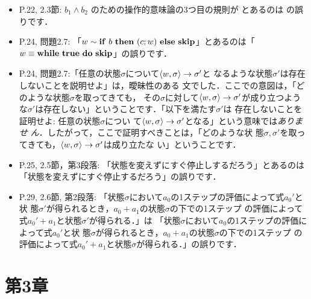 \documentclass[12pt,titlepage,twoside,openright,dvipdfmx]{jsbook}
\theoremstyle{definition}
\begin{document}
\begin{itemize}
  \item P.22, 2.3節: $b_1 \land b_2$ のための操作的意味論の3つ目の規則が
    \infrule
    { \arrow \Ttrue \andalso {} \arrow \Ttrue}
    { \arrow \Tfalse}
    とあるのは
    \infrule
    { \arrow \Ttrue \andalso {} \arrow \Ttrue}
    { \arrow \Ttrue}
    の誤りです．
  \item P.24, 問題2.7: 「$w \sim \Cif\ b\ \Cthen\ (c;w)\ \Celse\ \Cskip$」とあるのは「$w \equiv \Cwhile\ \Ttrue\ \Cdo\ \Cskip$」の誤りです．
  \item P.24,
    問題2.7:「任意の状態$\sigma$について$\langle{w,\sigma}\rangle\to \sigma'$と
    なるような状態$\sigma'$は存在しないことを説明せよ」は，曖昧性のある
    文でした．ここでの意図は，「どのような状態$\sigma$を取ってきても，
    その$\sigma$に対して$\langle{w,\sigma}\rangle\to \sigma'$が成り立つよう
    な$\sigma'$は存在しない」ということです．「以下を満たす$\sigma'$は
    存在しないことを証明せよ: 任意の状態$\sigma$につい
    て$\langle{w,\sigma}\rangle\to \sigma'$となる」という意味では\emph{ありませ
      ん}．したがって，ここで証明すべきことは，「どのような状
    態$\sigma,
    \sigma'$を取ってきても，$\langle{w,\sigma}\rangle \to \sigma'$は成り立たな
    い」ということです．
  \item P.25, 2.5節，第3段落: 「状態を変えずにすぐ停止しするだろう」とあるのは「状態を変えずにすぐ停止するだろう」の誤りです．
  \item P.29, 2.6節, 第2段落:
    「状態$\sigma$において$a_0$の1ステップの評価によって式$a_0'$と状
    態$\sigma'$が得られるとき，$a_0+a_1$の状態$\sigma$の下での1ステップ
    の評価によって式$a_0'+a_1$と状態$\sigma'$が得られる．」は
    「状態$\sigma$において$a_0$の1ステップの評価によって式$a_0'$と状
    態$\sigma$が得られるとき，$a_0+a_1$の状態$\sigma$の下での1ステップ
    の評価によって式$a_0'+a_1$と状態$\sigma$が得られる．」の誤りです．
\end{itemize}

\section*{第3章}

\newcommand{\AexpBinPropB}{
  \forall{a_0,a_1\in\mathbf{Aexp},\sigma\in\Sigma,m,n\in\mathbf{N}}. \\ &
  \tuple{a_0,\sigma}\rightarrow m \AND
  \tuple{a_1,\sigma}\rightarrow n \AND
}
\end{document}
